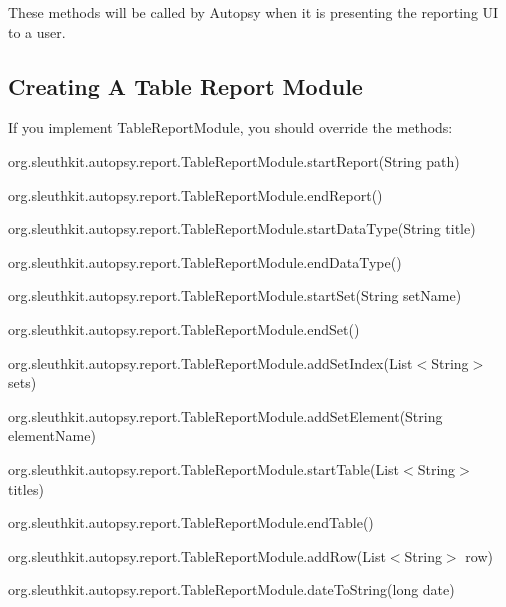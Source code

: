 These methods will be called by Autopsy when it is presenting the reporting UI to a user.\hypertarget{mod_report_page_report_create_module_table}{}\subsection{Creating A Table Report Module}\label{mod_report_page_report_create_module_table}
If you implement Table\+Report\+Module, you should override the methods\+:
\begin{DoxyItemize}
\item org.\+sleuthkit.\+autopsy.\+report.\+Table\+Report\+Module.\+start\+Report(\+String path)
\item org.\+sleuthkit.\+autopsy.\+report.\+Table\+Report\+Module.\+end\+Report()
\item org.\+sleuthkit.\+autopsy.\+report.\+Table\+Report\+Module.\+start\+Data\+Type(\+String title)
\item org.\+sleuthkit.\+autopsy.\+report.\+Table\+Report\+Module.\+end\+Data\+Type()
\item org.\+sleuthkit.\+autopsy.\+report.\+Table\+Report\+Module.\+start\+Set(\+String set\+Name)
\item org.\+sleuthkit.\+autopsy.\+report.\+Table\+Report\+Module.\+end\+Set()
\item org.\+sleuthkit.\+autopsy.\+report.\+Table\+Report\+Module.\+add\+Set\+Index(\+List$<$\+String$>$ sets)
\item org.\+sleuthkit.\+autopsy.\+report.\+Table\+Report\+Module.\+add\+Set\+Element(\+String element\+Name)
\item org.\+sleuthkit.\+autopsy.\+report.\+Table\+Report\+Module.\+start\+Table(\+List$<$\+String$>$ titles)
\item org.\+sleuthkit.\+autopsy.\+report.\+Table\+Report\+Module.\+end\+Table()
\item org.\+sleuthkit.\+autopsy.\+report.\+Table\+Report\+Module.\+add\+Row(\+List$<$\+String$>$ row)
\item org.\+sleuthkit.\+autopsy.\+report.\+Table\+Report\+Module.\+date\+To\+String(long date)
\end{DoxyItemize}

